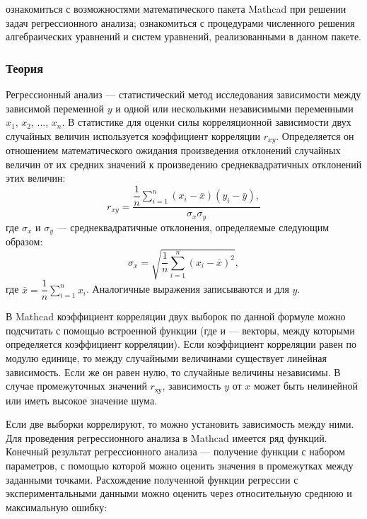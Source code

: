 
\goal ознакомиться с возможностями математического пакета Mathcad при решении задач регрессионного анализа; ознакомиться с процедурами численного решения алгебраических уравнений и систем уравнений, реализованными в данном пакете. 

\subsubsection*{Теория}
Регрессионный анализ --- статистический метод исследования зависимости между зависимой переменной $y$ и одной или несколькими независимыми переменными $x_1$, $x_2$, $...$, $x_n$.
В статистике для оценки силы корреляционной зависимости двух случайных величин используется коэффициент корреляции $r_{xy}$. Определяется он отношением математического ожидания произведения отклонений случайных величин от их средних значений к произведению среднеквадратичных отклонений этих величин:
\begin{equation}
r_{xy}=\dfrac{\dfrac{1}{n} \sum\limits_{i=1}^{n} (x_i-\bar{x}) (y_i-\bar{y}), }{\sigma_x \sigma_y}
\end{equation}
где $\sigma_x$ и $\sigma_y$ --- среднеквадратичные отклонения, определяемые следующим образом:
\begin{equation}
\sigma_x=\sqrt{\dfrac{1}{n} \sum\limits_{i=1}^{n}(x_i-\bar{x})^2},
\end{equation}
где $\bar{x}=\dfrac{1}{n} \sum\limits_{i=1}^{n} x_i$.
Аналогичные выражения записываются и для $y$.

В Mathcad коэффициент корреляции двух выборок по данной формуле можно подсчитать с помощью встроенной функции  (где  и  --- векторы, между которыми определяется коэффициент корреляции). Если коэффициент корреляции равен по модулю единице, то между случайными величинами существует линейная зависимость. Если же он равен нулю, то случайные величины независимы. В случае промежуточных значений $r_{ху}$, зависимость $y$ от $x$ может быть нелинейной или иметь высокое значение шума.

Если две выборки коррелируют, то можно установить зависимость между ними. Для проведения регрессионного анализа в Mathcad имеется ряд функций. Конечный результат регрессионного анализа --- получение функции с набором параметров, с помощью которой можно оценить значения в промежутках между заданными точками. Расхождение полученной функции регрессии с экспериментальными данными можно оценить через относительную среднюю и максимальную ошибку:

